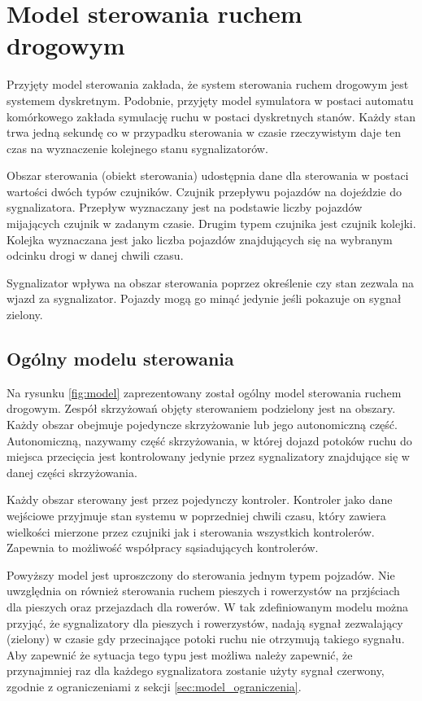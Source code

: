 \chapter{Model sterowania ruchem drogowym}
\label{chap:model}
Przyjęty model sterowania zakłada, że system sterowania ruchem drogowym jest systemem dyskretnym. Podobnie, przyjęty model symulatora w postaci automatu komórkowego zakłada symulację ruchu w postaci dyskretnych stanów. Każdy stan trwa jedną sekundę co w przypadku sterowania w czasie rzeczywistym daje ten czas na wyznaczenie kolejnego stanu sygnalizatorów.

Obszar sterowania (obiekt sterowania) udostępnia dane dla sterowania w postaci wartości dwóch typów czujników. Czujnik przepływu pojazdów na dojeździe do sygnalizatora. Przepływ wyznaczany jest na podstawie liczby pojazdów mijających czujnik w zadanym czasie. Drugim typem czujnika jest czujnik kolejki. Kolejka wyznaczana jest jako liczba pojazdów znajdujących się na wybranym odcinku drogi w danej chwili czasu.

Sygnalizator wpływa na obszar sterowania poprzez określenie czy stan zezwala na wjazd za sygnalizator. Pojazdy mogą go minąć jedynie jeśli pokazuje on sygnał zielony.

\section{Ogólny modelu sterowania}
\label{sec:model_opis}

Na rysunku \ref{fig:model} zaprezentowany został ogólny model sterowania ruchem drogowym.
Zespół skrzyżowań objęty sterowaniem podzielony jest na obszary.
Każdy obszar obejmuje pojedyncze skrzyżowanie lub jego autonomiczną część.
Autonomiczną, nazywamy część skrzyżowania, w której dojazd potoków ruchu do miejsca przecięcia jest kontrolowany jedynie przez sygnalizatory znajdujące się w danej części skrzyżowania.

Każdy obszar sterowany jest przez pojedynczy kontroler.
Kontroler jako dane wejściowe przyjmuje stan systemu w poprzedniej chwili czasu,
który zawiera wielkości mierzone przez czujniki jak i sterowania wszystkich kontrolerów. Zapewnia to możliwość współpracy sąsiadujących kontrolerów.

Powyższy model jest uproszczony do sterowania jednym typem pojzadów. Nie uwzględnia on również sterowania ruchem pieszych i rowerzystów na przjściach dla pieszych oraz przejazdach dla rowerów. W tak zdefiniowanym modelu można przyjąć, że sygnalizatory dla pieszych i rowerzystów, nadają sygnał zezwalający (zielony) w czasie gdy przecinające potoki ruchu nie otrzymują takiego sygnału.
Aby zapewnić że sytuacja tego typu jest możliwa należy zapewnić, że przynajmniej raz dla każdego sygnalizatora zostanie użyty sygnał czerwony, zgodnie z ograniczeniami z sekcji \ref{sec:model_ograniczenia}.

